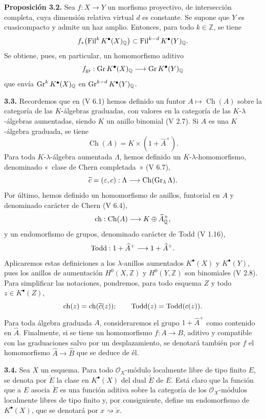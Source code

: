 \textbf{Proposición 3.2.} Sea $f:X\to Y$ un morfismo proyectivo, de
intersección completa, cuya dimensión relativa virtual $d$ es constante. Se
supone que $Y$ es cuasicompacto y admite un haz amplio. Entonces, para todo
$k\in\mathbb Z$, se tiene
\[
f_*\bigl(\operatorname{Fil}^kK^{\bullet}(X)_{\mathbb Q}\bigr)
\subset
\operatorname{Fil}^{k-d}K^{\bullet}(Y)_{\mathbb Q}.
\]
Se obtiene, pues, en particular, un homomorfismo aditivo
\[
f_{\mathrm{gr}}:\operatorname{Gr} K^{\bullet}(X)_{\mathbb Q}\longrightarrow
\operatorname{Gr} K^{\bullet}(Y)_{\mathbb Q}
\]
que envía $\operatorname{Gr}^kK^{\bullet}(X)_{\mathbb Q}$ en
$\operatorname{Gr}^{k-d}K^{\bullet}(Y)_{\mathbb Q}$.

\textbf{3.3.} Recordemos que en (V 6.1) hemos definido un funtor
$A\longmapsto \operatorname{Ch}(A)$ sobre la categoría de las $K$-álgebras
graduadas, con valores en la categoría de las $K$-$\lambda$-álgebras
aumentadas, siendo $K$ un anillo binomial (V 2.7). Si $A$ es una $K$-álgebra
graduada, se tiene
\[
\operatorname{Ch}(A)=K\times(1+\widehat A^+).
\]
Para toda $K$-$\lambda$-álgebra aumentada $\Lambda$, hemos definido un
$K$-$\lambda$-homomorfismo, denominado «~clase de Chern completada~» (V 6.7),
\[
\widetilde c=(\varepsilon,c):\Lambda\longrightarrow\operatorname{Ch}(\operatorname{Gr}_{\lambda}\Lambda).
\]
Por último, hemos definido un homomorfismo de anillos, funtorial en $A$ y
denominado carácter de Chern (V 6.4),
\[
\operatorname{ch}:\operatorname{Ch}(A)\longrightarrow K\oplus\widehat A^+_{\mathbb Q},
\]
y un endomorfismo de grupos, denominado carácter de Todd (V 1.16),
\[
\operatorname{Todd}:1+\widehat A^+\longrightarrow1+\widehat A^+.
\]
Aplicaremos estas definiciones a los $\lambda$-anillos aumentados
$K^{\bullet}(X)$ y $K^{\bullet}(Y)$, pues los anillos de aumentación
$H^0(X,\mathbb Z)$ y $H^0(Y,\mathbb Z)$ son binomiales (V 2.8). Para simplificar
las notaciones, pondremos, para todo esquema $Z$ y todo
$z\in K^{\bullet}(Z)$,
\[
\operatorname{ch}(z)=\operatorname{ch}(\widetilde c(z));
\qquad
\operatorname{Todd}(z)=\operatorname{Todd}(c(z)).
\]
Para toda álgebra graduada $A$, consideraremos el grupo $1+\widehat A^+$ como
contenido en $\widehat A$. Finalmente, si se tiene un homomorfismo $f:A\to B$,
aditivo y compatible con las graduaciones salvo por un desplazamiento, se
denotará también por $f$ el homomorfismo $\widehat A\to\widehat B$ que se deduce
de él.

\textbf{3.4.} Sea $X$ un esquema. Para todo $\mathcal O_X$-módulo localmente
libre de tipo finito $E$, se denota por $\check E$ la clase en $K^{\bullet}(X)$
del dual $\check E$ de $E$. Está claro que la función que a $E$ asocia
$\check E$ es una función aditiva sobre la categoría de los
$\mathcal O_X$-módulos localmente libres de tipo finito y, por consiguiente,
define un endomorfismo de $K^{\bullet}(X)$, que se denotará por
$x\rightsquigarrow\check x$.

